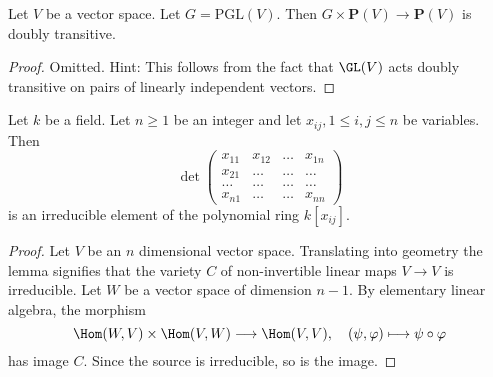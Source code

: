 \begin{lemma}
\label{lemma-doubly-transitive}
Let $V$ be a vector space. Let $G = \text{PGL}(V)$.
Then $G \times \mathbf{P}(V) \to \mathbf{P}(V)$ is
doubly transitive.
\end{lemma}

\begin{proof}
Omitted. Hint: This follows from the fact that $\GL(V)$ acts doubly
transitive on pairs of linearly independent vectors.
\end{proof}

\begin{lemma}
\label{lemma-determinant}
Let $k$ be a field. Let $n \geq 1$ be an integer and let
$x_{ij}, 1 \leq i, j \leq n$ be variables. Then
$$
\det
\left(
\begin{matrix}
x_{11} & x_{12} & \ldots & x_{1n} \\
x_{21} & \ldots & \ldots & \ldots \\
\ldots & \ldots & \ldots & \ldots \\
x_{n1} & \ldots & \ldots & x_{nn}
\end{matrix}
\right)
$$
is an irreducible element of the polynomial ring $k[x_{ij}]$.
\end{lemma}

\begin{proof}
Let $V$ be an $n$ dimensional vector space. Translating into geometry
the lemma signifies that the variety $C$ of non-invertible linear maps
$V \to V$ is irreducible. Let $W$ be a vector space of dimension $n - 1$.
By elementary linear algebra, the morphism
$$
\Hom(W, V) \times \Hom(V, W) \longrightarrow \Hom(V, V),\quad
(\psi, \varphi) \longmapsto \psi \circ \varphi
$$
has image $C$. Since the source is irreducible, so is the image.
\end{proof}

